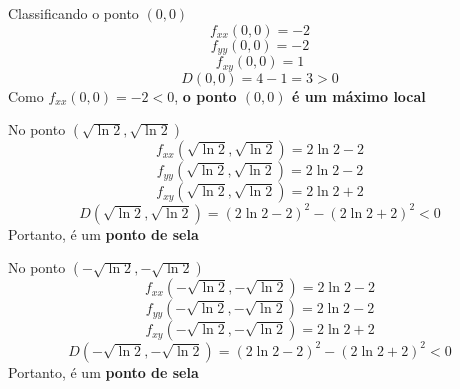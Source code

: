 \documentclass[a4paper,12pt,fleqn]{article}
\begin{document}
\begin{answer}
  \bigskip
  Classificando o ponto \((0, 0)\)
  \[
    f_{xx}(0, 0) = -2
  \]
  \[
    f_{yy}(0, 0) = -2
  \]
  \[
    f_{xy}(0, 0) =  1
  \]
  \[
    D(0, 0) = 4-1 = 3 > 0
  \]
  Como \(f_{xx}(0, 0) = -2 < 0\), \textbf{o ponto \((0,0)\) é um máximo local}

  \bigskip
  No ponto \(\left(\sqrt{\ln 2}, \sqrt{\ln 2}\right)\)
  \[
    f_{xx}\left(\sqrt{\ln 2}, \sqrt{\ln 2}\right)
    = 2\ln 2 -2
  \]
  \[
    f_{yy}\left(\sqrt{\ln 2}, \sqrt{\ln 2}\right)
    = 2\ln 2 -2
  \]
  \[
    f_{xy}\left(\sqrt{\ln 2}, \sqrt{\ln 2}\right)
    = 2\ln 2 +2
  \]
  \[
    D\left(\sqrt{\ln 2}, \sqrt{\ln 2}\right)
    = (2\ln 2 -2)^2 - (2\ln 2 +2)^2
    < 0
  \]
  Portanto, é um \textbf{ponto de sela}

  \bigskip
  No ponto \(\left(-\sqrt{\ln 2}, -\sqrt{\ln 2}\right)\)
  \[
    f_{xx}\left(-\sqrt{\ln 2}, -\sqrt{\ln 2}\right)
    = 2\ln 2 -2
  \]
  \[
    f_{yy}\left(-\sqrt{\ln 2}, -\sqrt{\ln 2}\right)
    = 2\ln 2 -2
  \]
  \[
    f_{xy}\left(-\sqrt{\ln 2}, -\sqrt{\ln 2}\right)
    = 2\ln 2 +2
  \]
  \[
    D\left(-\sqrt{\ln 2}, -\sqrt{\ln 2}\right)
    = (2\ln 2 -2)^2 - (2\ln 2 +2)^2
    < 0
  \]
  Portanto, é um \textbf{ponto de sela}
\end{answer}


\end{document}
